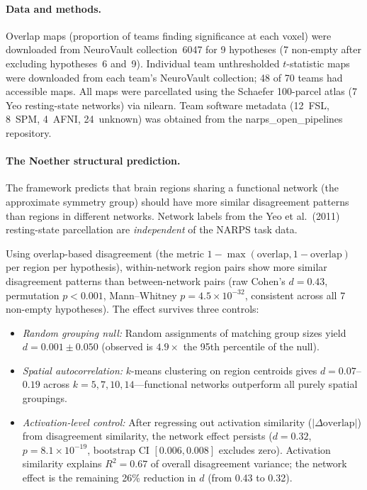 \documentclass[11pt,a4paper]{article}
\begin{document}
\paragraph{Data and methods.}
Overlap maps (proportion of teams finding significance at each voxel) were downloaded from NeuroVault collection~6047 for 9 hypotheses (7 non-empty after excluding hypotheses~6 and~9).  Individual team unthresholded $t$-statistic maps were downloaded from each team's NeuroVault collection; 48 of 70 teams had accessible maps.  All maps were parcellated using the Schaefer 100-parcel atlas (7 Yeo resting-state networks) via nilearn.  Team software metadata (12~FSL, 8~SPM, 4~AFNI, 24~unknown) was obtained from the narps\_open\_pipelines repository.

\paragraph{The Noether structural prediction.}
The framework predicts that brain regions sharing a functional network (the approximate symmetry group) should have more similar disagreement patterns than regions in different networks.  Network labels from the Yeo et al.\ (2011) resting-state parcellation are \emph{independent} of the NARPS task data.

Using overlap-based disagreement (the metric $1 - \max(\text{overlap}, 1 - \text{overlap})$ per region per hypothesis), within-network region pairs show more similar disagreement patterns than between-network pairs (raw Cohen's $d = 0.43$, permutation $p < 0.001$, Mann--Whitney $p = 4.5 \times 10^{-32}$, consistent across all 7 non-empty hypotheses).  The effect survives three controls:
\begin{itemize}
  \item \emph{Random grouping null:} Random assignments of matching group sizes yield $d = 0.001 \pm 0.050$ (observed is $4.9\times$ the 95th percentile of the null).
  \item \emph{Spatial autocorrelation:} $k$-means clustering on region centroids gives $d = 0.07$--$0.19$ across $k = 5, 7, 10, 14$---functional networks outperform all purely spatial groupings.
  \item \emph{Activation-level control:} After regressing out activation similarity ($|\Delta\text{overlap}|$) from disagreement similarity, the network effect persists ($d = 0.32$, $p = 8.1 \times 10^{-19}$, bootstrap CI $[0.006, 0.008]$ excludes zero).  Activation similarity explains $R^2 = 0.67$ of overall disagreement variance; the network effect is the remaining 26\% reduction in $d$ (from 0.43 to 0.32).
\end{itemize}
\end{document}
